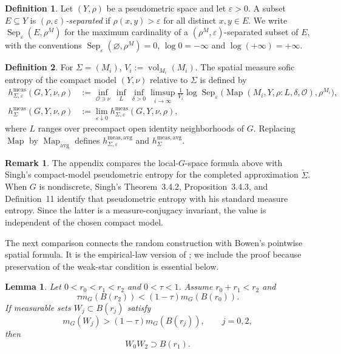\documentclass[12pt]{amsart}
\newtheorem{lemma}[lemma]{Lemma}
\theoremstyle{definition}
\newtheorem{definition}[definition]{Definition}
\newtheorem{remark}[remark]{Remark}
\newcommand{\Haar}{m_G}
\newcommand{\vol}{\operatorname{vol}}
\newcommand{\Map}{\operatorname{Map}}
\newcommand{\Mapavg}{\operatorname{Map}_{\mathrm{avg}}}
\newcommand{\Sep}{\operatorname{Sep}}
\newcommand{\cO}{\mathcal O}
\newcommand{\1}{\mathbf 1}
\newcommand{\eps}{\varepsilon}
\begin{document}
\begin{definition}
Let $(Y,\rho)$ be a pseudometric space and let $\eps>0$. A subset
$E\subseteq Y$ is \emph{$(\rho,\eps)$-separated} if
$\rho(x,y)>\eps$ for all distinct $x,y\in E$. We write
$\Sep_\eps(E,\rho^M)$ for the
maximum cardinality of a
$(\rho^M,\eps)$-separated subset of $E$, with the conventions
$\Sep_\eps(\varnothing,\rho^M)=0$, $\log0=-\infty$ and
$\log(+\infty)=+\infty$.
\end{definition}

\begin{definition}\label{def:spatial-entropy}
For $\Sigma=(M_i)$,  $V_i:=\vol_{M_i}(M_i)$. The spatial measure sofic
entropy of the compact model $(Y,\nu)$ relative to $\Sigma$ is defined by
\begin{align*}
 h^{\mathrm{meas}}_{\Sigma,\eps}(G,Y,\nu,\rho)
 &:={\inf}_{\cO\ni\nu}\,{\inf}_{L}\,{\inf}_{\delta>0}
 \limsup_{i\to\infty}\frac1{V_i}
 \log\Sep_\eps\bigl(\Map(M_i,Y,\rho:L,\delta,\cO),\rho^{M_i}\bigr),\\
 h^{\mathrm{meas}}_{\Sigma}(G,Y,\nu,\rho)
 &:=\lim_{\eps\downarrow0}
 h^{\mathrm{meas}}_{\Sigma,\eps}(G,Y,\nu,\rho),
\end{align*}
where $L$ ranges over precompact open identity neighborhoods of $G$.
Replacing $\Map$ by $\Mapavg$ defines
$h^{\mathrm{meas,avg}}_{\Sigma,\eps}$ and
$h^{\mathrm{meas,avg}}_\Sigma$.
\end{definition}
\begin{remark}
	The appendix compares the local-$G$-space formula above with Singh's
compact-model pseudometric entropy for the completed approximation
$\widetilde\Sigma$.  When $G$ is nondiscrete, Singh's
Theorem~3.4.2, Proposition~3.4.3, and Definition~11 identify that
pseudometric entropy with his standard measure entropy.  Since the latter
is a measure-conjugacy invariant, the value is independent of the chosen
compact model.
\end{remark}

The next comparison connects the random construction with Bowen's pointwise spatial formula. It is the empirical-law version of \cite[Proposition~4.10]{BowenLCEntropy}; we include the proof because preservation of the weak-star condition is essential below.

\begin{lemma}\label{lem:large-products}\cite[Lemma~4.11]{BowenLCEntropy}
Let $0<r_0<r_1<r_2$ and $0<\tau<1$. Assume $r_0+r_1<r_2$ and
\begin{equation}\label{eq:haar-balls-condition}
 \tau\Haar(B(r_2))<(1-\tau)\Haar(B(r_0)).
\end{equation}
If measurable sets $W_j\subset B(r_j)$ satisfy
\[
 \Haar(W_j)>(1-\tau)\Haar(B(r_j)),\qquad j=0,2,
\]
then
\[
 W_0W_2\supset B(r_1).
\]
\end{lemma}
\end{document}
